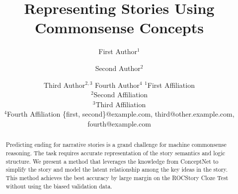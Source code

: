 \documentclass{article}
\title{Representing Stories Using Commonsense Concepts}
\author{
First Author$^1$
\and
Second Author$^2$\and
Third Author$^{2,3}$\And
Fourth Author$^4$
\affiliations
$^1$First Affiliation\\
$^2$Second Affiliation\\
$^3$Third Affiliation\\
$^4$Fourth Affiliation
\emails
\{first, second\}@example.com,
third@other.example.com,
fourth@example.com
}
\begin{document}
\maketitle

\begin{abstract}
Predicting ending for narrative stories is a grand challenge for
machine commonsense reasoning. The task requires accurate representation of
the story semantics and logic structure.
We present a method that leverages the knowledge from ConceptNet to simplify
the story and model the latent relationship among the key ideas in the story.
This method achieves the best accuracy by large margin on the ROCStory
Cloze Test without using the biased validation data.
\end{abstract}









\end{document}

